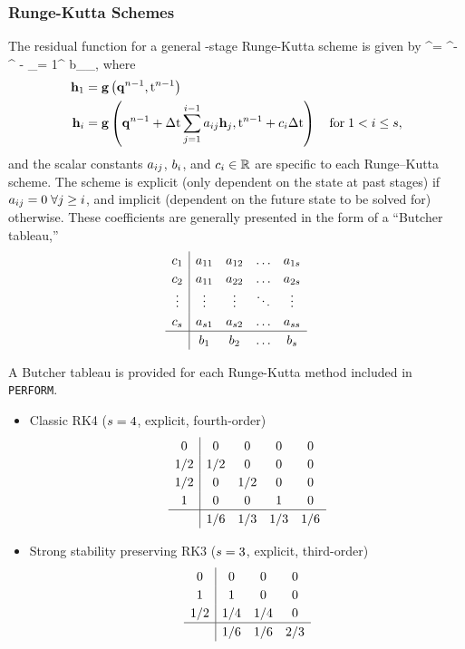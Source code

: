 \subsubsection{Runge-Kutta Schemes}

The residual function for a general \rkIdx -stage Runge-Kutta scheme is given by
\be\label{eq:RKResFOM}
    \resVec^\timeIdx = \consVec^\timeIdx - \consVec^{} - \Delta \timeVar \sum_{\dummyIdx = 1}^{\rkIdx} b_\dummyIdx \rkVec_\dummyIdx,
\ee
where
\begin{align}
    \mathbf{h}_1 &= \mathbf{g}\left(\mathbf{q}^{n - 1}, \text{t}^{n-1}\right) \\
    \mathbf{h}_{i} &= \mathbf{g}\left(\mathbf{q}^{n-1} + \Delta \text{t} \sum_{j = 1}^{i-1} a_{i j} \mathbf{h}_{j}, \text{t}^{n-1} + c_{i} \Delta \text{t}\right) \quad \text{for} \; 1 < i \le s,
\end{align}
and the scalar constants $a_{i j}$, $b_{i}$, and $c_{i} \in \mathbb{R}$ are specific to each Runge--Kutta scheme. The scheme is explicit (only dependent on the state at past stages) if $a_{i j} = 0 \; \forall j \ge i$, and implicit (dependent on the future state to be solved for) otherwise. These coefficients are generally presented in the form of a ``Butcher tableau,''
\[
\renewcommand\arraystretch{1.2}
\begin{array}
{c|cccc}
c_1 & a_{11} & a_{12} & \hdots & a_{1 \rkIdx} \\
c_2 & a_{11} & a_{22} & \hdots & a_{2 \rkIdx} \\
\vdots & \vdots & \vdots & \ddots & \vdots \\
c_\rkIdx & a_{\rkIdx 1} & a_{\rkIdx 2} & \hdots & a_{\rkIdx \rkIdx} \\
\hline
& b_1 & b_2 & \hdots & b_\rkIdx 
\end{array}
\]

A Butcher tableau is provided for each Runge-Kutta method included in \verb|PERFORM|.
\begin{itemize}
    \item Classic RK4 ($s=4$, explicit, fourth-order)
    \[
    \renewcommand\arraystretch{1.2}
    \begin{array}
    {c|cccc}
    0 & 0 & 0 & 0 & 0 \\
    1/2 & 1/2 & 0 & 0 & 0 \\
    1/2 & 0 & 1/2 & 0 & 0 \\
    1 & 0 & 0 & 1 & 0 \\
    \hline
    & 1/6 & 1/3 & 1/3 & 1/6 
    \end{array}
    \]
    \item Strong stability preserving RK3 ($s = 3$, explicit, third-order)
    \[
    \renewcommand\arraystretch{1.2}
    \begin{array}
    {c|ccc}
    0 & 0 & 0 & 0 \\
    1 & 1 & 0 & 0 \\
    1/2 & 1/4 & 1/4 & 0 \\
    \hline
    & 1/6 & 1/6 & 2/3  
    \end{array}
    \]
\end{itemize}


